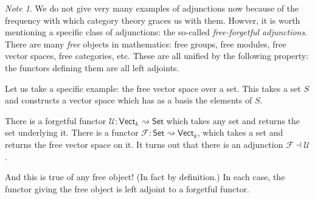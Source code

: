 \documentclass[a4paper,10pt]{scrreprt}
\theoremstyle{definition}
\theoremstyle{plain}
\theoremstyle{remark}
\newtheorem{note}{Note}[section]
\begin{document}
\begin{note}
  We do not give very many examples of adjunctions now because of the frequency with which category theory graces us with them. Howver, it is worth mentioning a specific class of adjunctions: the so-called \emph{free-forgetful adjunctions}. There are many \emph{free} objects in mathematics: free groups, free modules, free vector spaces, free categories, etc. These are all unified by the following property: the functors defining them are all left adjoints.

  Let us take a specific example: the free vector space over a set. This takes a set $S$ and constructs a vector space which has as a basis the elements of $S$.

  There is a forgetful functor $\mathcal{U}\colon \mathsf{Vect}_{k} \rightsquigarrow \mathsf{Set}$ which takes any set and returns the set underlying it. There is a functor $\mathcal{F}\colon \mathsf{Set} \rightsquigarrow \mathsf{Vect}_{k}$, which takes a set and returns the free vector space on it. It turns out that there is an adjunction $\mathcal{F} \dashv \mathcal{U}$.

  And this is true of any free object! (In fact by definition.) In each case, the functor giving the free object is left adjoint to a forgetful functor.
\end{note}
\end{document}
